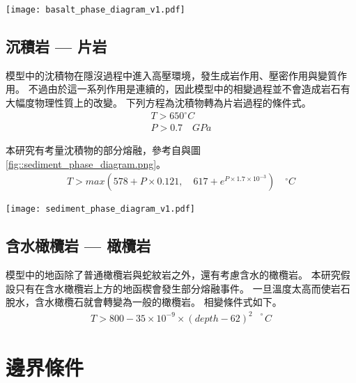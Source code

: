 \begin{figure*}[ht!]
    \centering
    \texttt{[image: basalt\_phase\_diagram\_v1.pdf]}
    \caption{鎂鐵質岩相圖，綠線隔開玄武岩與榴輝岩的穩定場，改編自\citealp{Hacker2003}，橘線為鎂鐵質岩的濕固相線(wet solidus)，改編自\citealp{Gutscher2000Bcan}}
    \label{fig::basalt_phase_diagram}
\end{figure*}

\subsection{沉積岩 --- 片岩}
模型中的沈積物在隱沒過程中進入高壓環境，發生成岩作用、壓密作用與變質作用。
不過由於這一系列作用是連續的，因此模型中的相變過程並不會造成岩石有大幅度物理性質上的改變。
下列方程為沈積物轉為片岩過程的條件式。
\begin{align}
T > 650^{\circ} C\\
P >  0.7 \quad GPa 
\end{align}

本研究有考量沈積物的部分熔融，參考自\citealp{Forster2021}與圖\ref{fig::sediment_phase_diagram.png}。
\begin{align}
    T > max (578+ P \times 0.121,  \quad 617+e^{P\times 1.7\times 10^{-3}}) \quad ^{\circ} C
\end{align}

\begin{figure*}[ht!]
    \centering
    \texttt{[image: sediment\_phase\_diagram\_v1.pdf]}
    \caption{沈積物變質岩相圖，橘線為沈積物濕固相線，改編自\citealp{Forster2021}。}
    \label{fig::sediment_phase_diagram.png}
\end{figure*}


\subsection{含水橄欖岩 --- 橄欖岩}

模型中的地函除了普通橄欖岩與蛇紋岩之外，還有考慮含水的橄欖岩。
本研究假設只有在含水橄欖岩上方的地函楔會發生部分熔融事件。
一旦溫度太高而使岩石脫水，含水橄欖石就會轉變為一般的橄欖岩。
相變條件式如下。
\begin{align}
T > 800-35\times 10^{-9}\times (depth-62)^{2  \quad \circ}C
\end{align}

\section{邊界條件}

